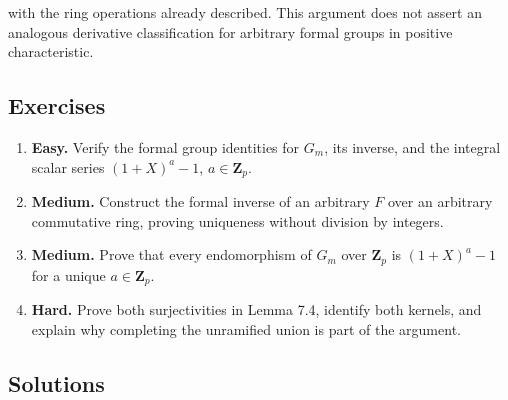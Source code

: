 \documentclass[11pt,a4paper]{article}
\newcommand{\tightlist}{\setlength{\itemsep}{0pt}\setlength{\parskip}{0pt}}
\begin{document}
with the ring operations already described. This argument does not
assert an analogous derivative classification for arbitrary formal
groups in positive characteristic.

\subsection{Exercises}\label{exercises}

\begin{enumerate}
\def\labelenumi{\arabic{enumi}.}
\tightlist
\item
  \textbf{Easy.} Verify the formal group identities for \(G_m\), its
  inverse, and the integral scalar series \((1+X)^a-1\),
  \(a\in\mathbf Z_p\).
\item
  \textbf{Medium.} Construct the formal inverse of an arbitrary \(F\)
  over an arbitrary commutative ring, proving uniqueness without
  division by integers.
\item
  \textbf{Medium.} Prove that every endomorphism of \(G_m\) over
  \(\mathbf Z_p\) is \((1+X)^a-1\) for a unique \(a\in\mathbf Z_p\).
\item
  \textbf{Hard.} Prove both surjectivities in Lemma 7.4, identify both
  kernels, and explain why completing the unramified union is part of
  the argument.
\end{enumerate}

\subsection{Solutions}\label{solutions}
\end{document}
